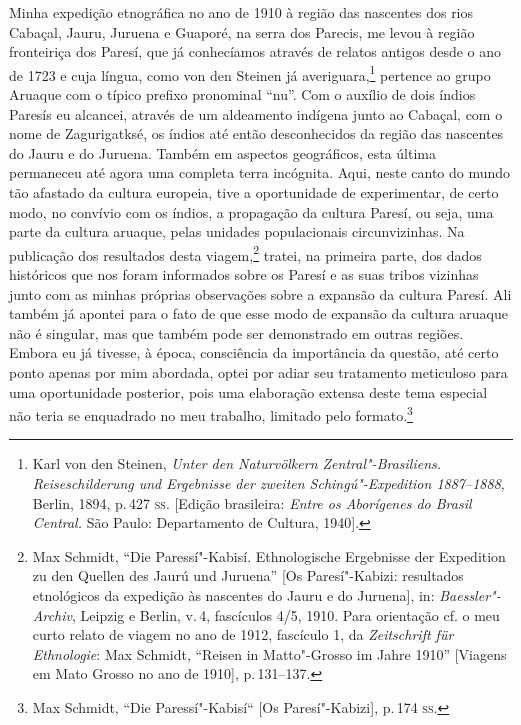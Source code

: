 Minha expedição etnográfica no ano de 1910 à região das nascentes dos
rios Cabaçal, Jauru, Juruena e Guaporé, na serra dos Parecis, me levou à
região fronteiriça dos Paresí, que já conhecíamos através de relatos
antigos desde o ano de 1723 e cuja língua, como von den Steinen já
averiguara,\footnote{Karl von den Steinen, \textit{Unter den Naturvölkern
  Zentral"-Brasiliens. Reiseschilderung und Ergebnisse der zweiten
  Schingú"-Expedition 1887--1888}, Berlin, 1894, p.\,427 \textsc{ss}. {[}Edição
  brasileira: \textit{Entre os Aborígenes do Brasil Central.} São Paulo:
  Departamento de Cultura, 1940{]}.} pertence ao grupo Aruaque com o
típico prefixo pronominal ``nu''. Com o auxílio de dois índios Paresís
eu alcancei, através de um aldeamento indígena junto ao Cabaçal, com o
nome de Zagurigatksé, os índios até então desconhecidos da região das
nascentes do Jauru e do Juruena. Também em aspectos geográficos, esta
última permaneceu até agora uma completa terra incógnita. Aqui, neste
canto do mundo tão afastado da cultura europeia, tive a oportunidade de
experimentar, de certo modo, no convívio com os índios, a propagação da
cultura Paresí, ou seja, uma parte da cultura aruaque, pelas unidades
populacionais circunvizinhas. Na publicação dos resultados desta
viagem,\footnote{Max Schmidt, ``Die Paressí"-Kabisí. Ethnologische
  Ergebnisse der Expedition zu den Quellen des Jaurú und Juruena''
  {[}Os Paresí"-Kabizi: resultados etnológicos da expedição às nascentes
  do Jauru e do Juruena{]}, in: \textit{Baessler"-Archiv}, Leipzig e
  Berlin, v.\,4, fascículos 4/5, 1910. Para orientação cf. o meu curto
  relato de viagem no ano de 1912, fascículo 1, da \textit{Zeitschrift für
  Ethnologie}: Max Schmidt, ``Reisen in Matto"-Grosso im Jahre 1910''
  {[}Viagens em Mato Grosso no ano de 1910{]}, p.\,131--137.} tratei, na
primeira parte, dos dados históricos que nos foram informados sobre os
Paresí e as suas tribos vizinhas junto com as minhas próprias
observações sobre a expansão da cultura Paresí. Ali também já apontei
para o fato de que esse modo de expansão da cultura aruaque não é singular, mas que
também pode ser demonstrado em outras regiões. Embora eu já tivesse,
à época, consciência da importância da questão, até certo ponto apenas
por mim abordada, optei por adiar seu
tratamento meticuloso para uma oportunidade posterior, pois uma
elaboração extensa deste tema especial não teria se enquadrado no meu
trabalho, limitado pelo formato.\footnote{Max Schmidt, ``Die
  Paressí"-Kabisí`` {[}Os Paresí"-Kabizi{]}, p.\,174 \textsc{ss}.}

